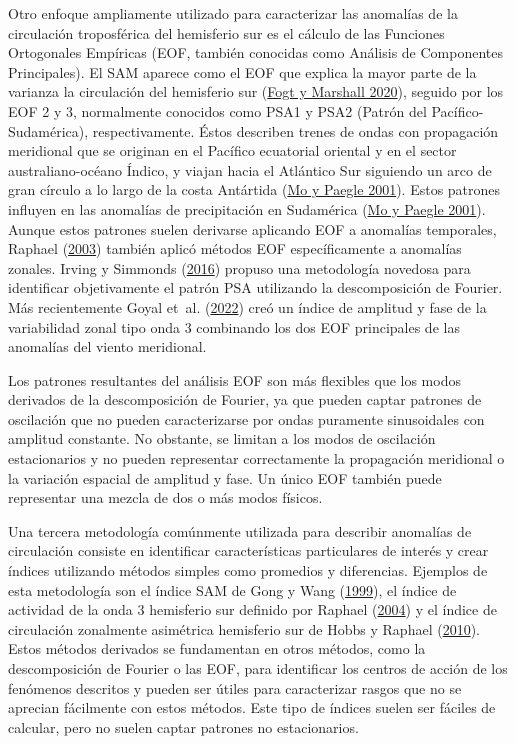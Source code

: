 \documentclass[12pt,oneside,a4paper]{reedthesis}
\begin{document}
Otro enfoque ampliamente utilizado para caracterizar las anomalías de la circulación troposférica del hemisferio sur es el cálculo de las Funciones Ortogonales Empíricas (EOF, también conocidas como Análisis de Componentes Principales).
El SAM aparece como el EOF que explica la mayor parte de la varianza la circulación del hemisferio sur (\protect\hyperlink{ref-fogt2020}{Fogt y Marshall 2020}), seguido por los EOF 2 y 3, normalmente conocidos como PSA1 y PSA2 (Patrón del Pacífico-Sudamérica), respectivamente.
Éstos describen trenes de ondas con propagación meridional que se originan en el Pacífico ecuatorial oriental y en el sector australiano-océano Índico, y viajan hacia el Atlántico Sur siguiendo un arco de gran círculo a lo largo de la costa Antártida (\protect\hyperlink{ref-mo2001}{Mo y Paegle 2001}).
Estos patrones influyen en las anomalías de precipitación en Sudamérica (\protect\hyperlink{ref-mo2001}{Mo y Paegle 2001}).
Aunque estos patrones suelen derivarse aplicando EOF a anomalías temporales, Raphael (\protect\hyperlink{ref-raphael2003}{2003}) también aplicó métodos EOF específicamente a anomalías zonales.
Irving y Simmonds (\protect\hyperlink{ref-irving2016}{2016}) propuso una metodología novedosa para identificar objetivamente el patrón PSA utilizando la descomposición de Fourier.
Más recientemente Goyal et~al. (\protect\hyperlink{ref-goyal2022}{2022}) creó un índice de amplitud y fase de la variabilidad zonal tipo onda 3 combinando los dos EOF principales de las anomalías del viento meridional.

Los patrones resultantes del análisis EOF son más flexibles que los modos derivados de la descomposición de Fourier, ya que pueden captar patrones de oscilación que no pueden caracterizarse por ondas puramente sinusoidales con amplitud constante.
No obstante, se limitan a los modos de oscilación estacionarios y no pueden representar correctamente la propagación meridional o la variación espacial de amplitud y fase.
Un único EOF también puede representar una mezcla de dos o más modos físicos.

Una tercera metodología comúnmente utilizada para describir anomalías de circulación consiste en identificar características particulares de interés y crear índices utilizando métodos simples como promedios y diferencias.
Ejemplos de esta metodología son el índice SAM de Gong y Wang (\protect\hyperlink{ref-gong1999}{1999}), el índice de actividad de la onda 3 hemisferio sur definido por Raphael (\protect\hyperlink{ref-raphael2004}{2004}) y el índice de circulación zonalmente asimétrica hemisferio sur de Hobbs y Raphael (\protect\hyperlink{ref-hobbs2010}{2010}).
Estos métodos derivados se fundamentan en otros métodos, como la descomposición de Fourier o las EOF, para identificar los centros de acción de los fenómenos descritos y pueden ser útiles para caracterizar rasgos que no se aprecian fácilmente con estos métodos.
Este tipo de índices suelen ser fáciles de calcular, pero no suelen captar patrones no estacionarios.
\end{document}
